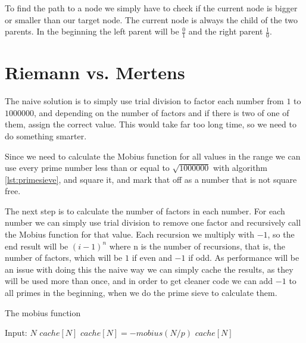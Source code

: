 \documentclass[11pt,a4paper,twoside]{article}
\begin{document}

To find the path to a node we simply have to check if the current node is
bigger or smaller than our target node. The current node is always the child of
the two parents. In the beginning the left parent will be $\frac{0}{1}$ and the
right parent $\frac{1}{0}$.


\section{Riemann vs. Mertens}

The naive solution is to simply use trial division to factor each number from
$1$ to $1000000$, and depending on the number of factors and if there is two of
one of them, assign the correct value. This would take far too long time, so we
need to do something smarter.

Since we need to calculate the Mobius function for all values in the range we
can use every prime number less than or equal to $\sqrt{1000000}$ with
algorithm \ref{lst:primesieve}, and square it, and mark that off as a number
that is not square free.

The next step is to calculate the number of factors in each number. For each
number we can simply use trial division to remove one factor and recursively
call the Mobius function for that value. Each recursion we multiply with $-1$,
so the end result will be $(i-1)^n$ where n is the number of recursions, that
is, the number of factors, which will be $1$ if even and $-1$ if odd. As
performance will be an issue with doing this the naive way we can simply cache
the results, as they will be used more than once, and in order to get cleaner
code we can add $-1$ to all primes in the beginning, when we do the prime sieve
to calculate them.

\begin{algorithm}
    \label{mobius}
    \caption{The mobius function}
    \begin{algorithmic}
        \REQUIRE Input: $N$
            \RETURN $cache[N]$
        \ENDIF
                \STATE $cache[N] = - mobius(N/p)$
                \RETURN $cache[N]$
            \ENDIF
        \ENDFOR
    \end{algorithmic}
\end{algorithm}
\end{document}
